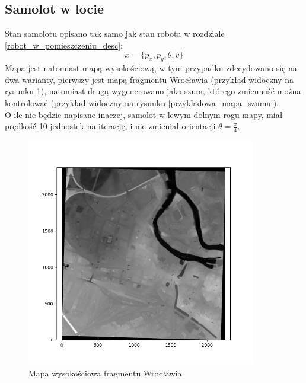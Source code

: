 \subsection{Samolot w locie} \label{samolot_w_locie_chap}
Stan samolotu opisano tak samo jak stan robota w rozdziale \ref{robot_w_pomieszczeniu_desc}:
\begin{equation*}
	x = \{p_x,p_y,\theta,v\}
\end{equation*}
Mapa jest natomiast mapą wysokościową, w tym przypadku zdecydowano się na dwa warianty, pierwszy jest mapą fragmentu Wrocławia (przykład widoczny na rysunku \ref{przykladowa_mapa_wroclawia}), natomiast drugą wygenerowano jako szum, którego zmienność można kontrolować (przykład widoczny na rysunku \ref{przykladowa_mapa_szumu}).\\
O ile nie będzie napisane inaczej, samolot w lewym dolnym rogu mapy, miał prędkość 10 jednostek na iterację, i nie zmieniał orientacji $\theta=\frac{\pi}{4}$.
\begin{figure}[H]
	\begin{center}
		\includegraphics[width=10cm]{./przykladowa_mapa_wroclawia.png}
		\caption{Mapa wysokościowa fragmentu Wrocławia}
		\label{przykladowa_mapa_wroclawia}
	\end{center}
\end{figure}
